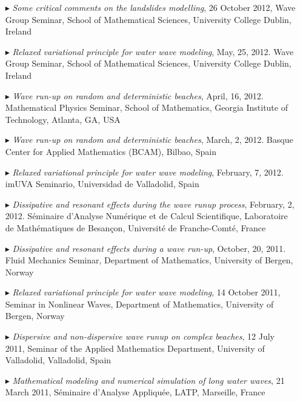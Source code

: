 \begin{itemize}
  \item[$\blacktriangleright$] \textit{Some critical comments on the landslides modelling}, 26 October 2012, Wave Group Seminar, School of Mathematical Sciences, University College Dublin, Ireland

  \item[$\blacktriangleright$] \textit{Relaxed variational principle for water wave modeling}, May, 25, 2012. Wave Group Seminar, School of Mathematical Sciences, University College Dublin, Ireland

  \item[$\blacktriangleright$] \textit{Wave run-up on random and deterministic beaches}, April, 16, 2012. Mathematical Physics Seminar, School of Mathematics, Georgia Institute of Technology, Atlanta, GA, USA

  \item[$\blacktriangleright$] \textit{Wave run-up on random and deterministic beaches}, March, 2, 2012. Basque Center for Applied Mathematics (BCAM), Bilbao, Spain

  \item[$\blacktriangleright$] \textit{Relaxed variational principle for water wave modeling}, February, 7, 2012. imUVA Seminario, Universidad de Valladolid, Spain
  
  \item[$\blacktriangleright$] \textit{Dissipative and resonant effects during the wave runup process}, February, 2, 2012. S\'eminaire d'Analyse Num\'erique et de Calcul Scientifique, Laboratoire de Math\'ematiques de Besan\c{c}on, Universit\'e de Franche-Comt\'e, France

  \item[$\blacktriangleright$] \textit{Dissipative and resonant effects during a wave run-up}, October, 20, 2011. Fluid Mechanics Seminar, Department of Mathematics, University of Bergen, Norway

  \item[$\blacktriangleright$] \textit{Relaxed variational principle for water wave modeling}, 14 October 2011, Seminar in Nonlinear Waves, Department of Mathematics, University of Bergen, Norway

  \item[$\blacktriangleright$] \textit{Dispersive and non-dispersive wave runup on complex beaches}, 12 July 2011, Seminar of the Applied Mathematics Department, University of Valladolid, Valladolid, Spain
  
  \item[$\blacktriangleright$] \textit{Mathematical modeling and numerical simulation of long water waves},  21 March 2011, S\'eminaire d'Analyse Appliqu\'ee, LATP, Marseille, France
  

\end{itemize}
